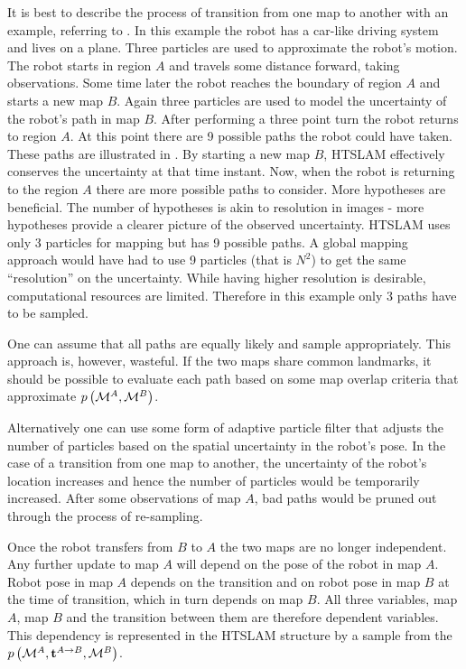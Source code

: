 It is best to describe the process of transition from one map to
another with an example, referring to
. In this example the robot has a
car-like driving system and lives on a plane. Three particles are used
to approximate the robot's motion. The robot starts in region $A$ and
travels some distance forward, taking observations. Some time later
the robot reaches the boundary of region $A$ and starts a new map
$B$. Again three particles are used to model the uncertainty of the
robot's path in map $B$. After performing a three point turn the robot
returns to region $A$. At this point there are 9 possible paths the
robot could have taken. These paths are illustrated in
. By starting a new map $B$, HTSLAM
effectively conserves the uncertainty at that time instant. Now, when
the robot is returning to the region $A$ there are more possible paths
to consider. More hypotheses are beneficial. The number of hypotheses
is akin to resolution in images - more hypotheses provide a clearer
picture of the observed uncertainty. HTSLAM uses only 3 particles for
mapping but has 9 possible paths. A global mapping approach would have
had to use 9 particles (that is $N^2$) to get the same ``resolution''
on the uncertainty. While having higher resolution is desirable,
computational resources are limited. Therefore in this example only 3
paths have to be sampled.

One can assume that all paths are equally likely and sample
appropriately. This approach is, however, wasteful. If the two maps
share common landmarks, it should be possible to evaluate each path
based on some map overlap criteria that approximate
$\prob{\mapA,\mapB}$.

Alternatively one can use some form of adaptive particle filter
\cite{KLDSampling} that adjusts the number of particles
based on the spatial uncertainty in the robot's pose. In the case of a
transition from one map to another, the uncertainty of the robot's
location increases and hence the number of particles would be
temporarily increased. After some observations of map $A$, bad paths
would be pruned out through the process of re-sampling. 


Once the robot transfers from $B$ to $A$ the two maps are no longer
independent. Any further update to map $A$ will depend on the pose of
the robot in map $A$. Robot pose in map $A$ depends on the transition
and on robot pose in map $B$ at the time of transition, which in turn
depends on map $B$. All three variables, map $A$, map $B$ and the
transition between them are therefore dependent variables. This
dependency is represented in the HTSLAM structure by a sample from the
$\prob{\mapA,\tr{}{A}{B},\mapB}$.

